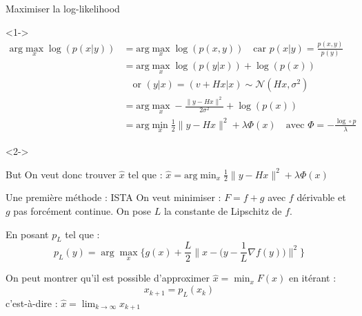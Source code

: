 \documentclass[11pt]{beamer}
\begin{document}
\begin{frame}{Maximiser la log-likelihood}
    \begin{visibleenv}<1->
        \begin{align*}
            \text{arg} \max_x \log(p(x|y)) &= \text{arg} \max_x \log(p(x, y)) \quad \text{car } p(x|y) = \frac{p(x, y)}{p(y)} \\
            &= \text{arg} \max_x \log(p(y|x)) + \log(p(x)) \\
            &\quad \text{or } (y|x) = (v+Hx|x) \sim \mathcal{N}(Hx, \sigma^2) \\
            &= \text{arg} \max_x -\frac{\lVert y-Hx \rVert ^2}{2 \sigma^2} + \log(p(x)) \\
            &= \text{arg} \min_x \frac{1}{2}\lVert y-Hx \rVert ^2 + \lambda \Phi(x) \quad \text{avec } \Phi = -\frac{\log \circ p}{\lambda}
        \end{align*}
    \end{visibleenv}

    \begin{visibleenv}<2->
        \begin{alertblock}{But}
            On veut donc trouver $\hat{x}$ tel que : $\hat{x} = \text{arg} \displaystyle \min_x \frac{1}{2} \lVert y-Hx \rVert ^2 + \lambda \Phi(x)$
        \end{alertblock}
    \end{visibleenv}
\end{frame}

\begin{frame}{Une première méthode : ISTA}
    On veut minimiser : $F = f + g$ avec $f$ dérivable et $g$ pas forcément continue.
    On pose $L$ la constante de Lipschitz de $f$.

    En posant $p_L$ tel que : $$ p_L(y) = \arg \max_x \Bigg\{ g(x) + \frac{L}{2} \Big\lVert x - \Big(y - \frac{1}{L} \nabla f(y)\Big) \Big\rVert ^2 \Bigg\}$$

    On peut montrer qu'il est possible d'approximer $\hat{x} = \displaystyle \min_x F(x)$ en itérant :
    $$x_{k+1} = p_L(x_k)$$
    c'est-à-dire : $\hat{x} = \displaystyle \lim_{k \rightarrow \infty} x_{k+1}$

\end{frame}
\end{document}
